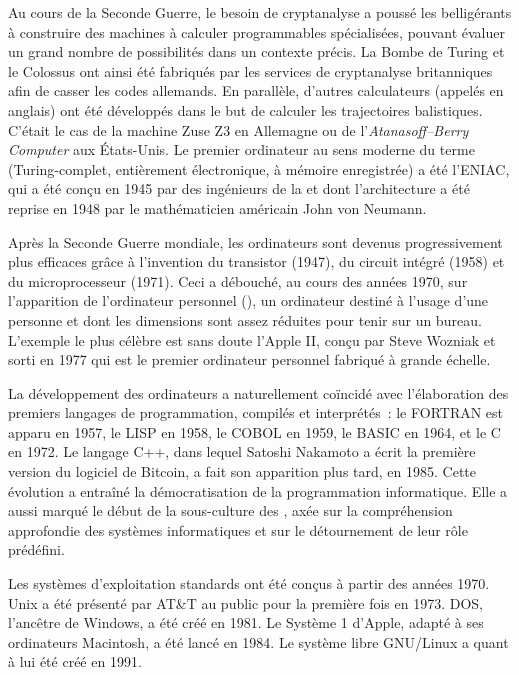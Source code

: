 Au cours de la Seconde Guerre, le besoin de cryptanalyse a poussé les belligérants à construire des machines à calculer programmables spécialisées, pouvant évaluer un grand nombre de possibilités dans un contexte précis. La Bombe de Turing et le Colossus ont ainsi été fabriqués par les services de cryptanalyse britanniques afin de casser les codes allemands. En parallèle, d'autres calculateurs (appelés  en anglais) ont été développés dans le but de calculer les trajectoires balistiques. C'était le cas de la machine Zuse Z3 en Allemagne ou de l'\emph{Atanasoff–Berry Computer} aux États-Unis. Le premier ordinateur au sens moderne du terme (Turing-complet, entièrement électronique, à mémoire enregistrée) a été l'ENIAC, qui a été conçu en 1945 par des ingénieurs de la  et dont l'architecture a été reprise en 1948 par le mathématicien américain John von Neumann.

Après la Seconde Guerre mondiale, les ordinateurs sont devenus progressivement plus efficaces grâce à l'invention du transistor (1947), du circuit intégré (1958) et du microprocesseur (1971). Ceci a débouché, au cours des années 1970, sur l'apparition de l'ordinateur personnel (), un ordinateur destiné à l'usage d'une personne et dont les dimensions sont assez réduites pour tenir sur un bureau. L'exemple le plus célèbre est sans doute l'Apple II, conçu par Steve Wozniak et sorti en 1977 qui est le premier ordinateur personnel fabriqué à grande échelle.

La développement des ordinateurs a naturellement coïncidé avec l'élaboration des premiers langages de programmation, compilés et interprétés~: le FORTRAN est apparu en 1957, le LISP en 1958, le COBOL en 1959, le BASIC en 1964, et le C en 1972. Le langage C++, dans lequel Satoshi Nakamoto a écrit la première version du logiciel de Bitcoin, a fait son apparition plus tard, en 1985. Cette évolution a entraîné la démocratisation de la programmation informatique. Elle a aussi marqué le début de la sous-culture des , axée sur la compréhension approfondie des systèmes informatiques et sur le détournement de leur rôle prédéfini. %

Les systèmes d'exploitation standards ont été conçus à partir des années 1970. Unix a été présenté par AT\&T au public pour la première fois en 1973. DOS, l'ancêtre de Windows, a été créé en 1981. Le Système 1 d'Apple, adapté à ses ordinateurs Macintosh, a été lancé en 1984. Le système libre GNU/Linux a quant à lui été créé en 1991.

